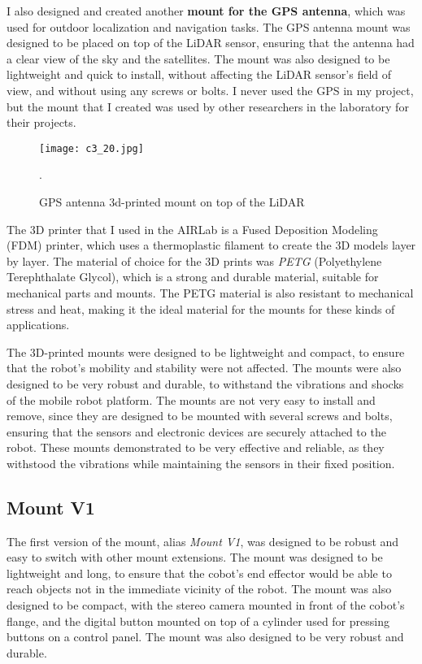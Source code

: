 I also designed and created another \textbf{mount for the GPS antenna}, which was used for outdoor localization
and navigation tasks. The GPS antenna mount was designed to be placed on top of the LiDAR sensor, ensuring
that the antenna had a clear view of the sky and the satellites. The mount was also designed to be lightweight
and quick to install, without affecting the LiDAR sensor's field of view, and without using any screws or bolts.
I never used the GPS in my project, but the mount that I created was used by other researchers in the laboratory
for their projects.

\begin{figure}[t]
    \centering
    \texttt{[image: c3\_20.jpg]}
    \captionsetup{width=1\linewidth}
    \caption{GPS antenna 3d-printed mount on top of the LiDAR}.
    \label{fig:c3_img20}
\end{figure}

The 3D printer that I used in the AIRLab is a Fused Deposition Modeling (FDM) printer,
which uses a thermoplastic filament to create the 3D models layer by layer. The material of choice
for the 3D prints was \textit{PETG} (Polyethylene Terephthalate Glycol), which is a strong and durable material,
suitable for mechanical parts and mounts. The PETG material is also resistant to mechanical stress and heat,
making it the ideal material for the mounts for these kinds of applications.

The 3D-printed mounts were designed to be lightweight and compact, to ensure that the robot's mobility and stability
were not affected. The mounts were also designed to be very robust and durable, to withstand the vibrations and shocks
of the mobile robot platform. The mounts are not very easy to install and remove, since they are designed to be
mounted with several screws and bolts, ensuring that the sensors and electronic devices are securely attached to the robot.
These mounts demonstrated to be very effective and reliable, as they withstood the vibrations while maintaining
the sensors in their fixed position.

\subsection{Mount V1}


The first version of the mount, alias \textit{Mount V1}, was designed to be robust and easy to switch with other
mount extensions. The mount was designed to be lightweight and long, to ensure that the cobot's end effector
would be able to reach objects not in the immediate vicinity of the robot. The mount was also designed to be
compact, with the stereo camera mounted in front of the cobot's flange, and the digital button mounted on top
of a cylinder used for pressing buttons on a control panel. The mount was also designed to be very robust and durable.

